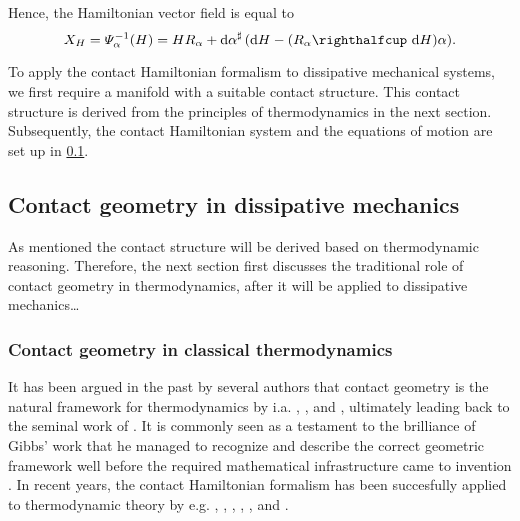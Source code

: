 Hence, the Hamiltonian vector field is equal to
\begin{equation}
    X_H = \Psi^{-1}_\alpha(H) = H R_\alpha + \fromDual{\dd{\alpha}}\qty(\dd{H} - (\intpr{R_\alpha}{\dd{H}})\alpha).
    \label{eq:contact_hamiltonian_vf}
\end{equation}

To apply the contact Hamiltonian formalism to dissipative mechanical systems, we first require a manifold with a suitable contact structure. This contact structure is derived from the principles of thermodynamics in the next section. Subsequently, the contact Hamiltonian system and the equations of motion are set up in \cref{ssec:contact_dissipation}.


\subsection{Contact geometry in dissipative mechanics}
\label{ssec:contact_dissipation}
As mentioned the contact structure will be derived based on thermodynamic reasoning. Therefore, the next section first discusses the traditional role of contact geometry in thermodynamics, after it will be applied to dissipative mechanics\dots

\subsubsection{Contact geometry in classical thermodynamics}
\label{sssec:contact_thermodynamics}
It has been argued in the past by several authors that contact geometry is the natural framework for thermodynamics by i.a. \citet{Arnold1991,Arnold1989a,Arnold1989,Arnold1989b}, \citet{Bamberg1988}, \citet{Burke1985} and \citet{Hermann1973}, ultimately leading back to the seminal work of \citet{Gibbs1873}. It is commonly seen as a testament to the brilliance of Gibbs' work that he managed to recognize and describe the correct geometric framework well before the required mathematical infrastructure came to invention \cite{Wightman1979}. In recent years, the contact Hamiltonian formalism has been succesfully applied to thermodynamic theory by e.g. \citet{Mrugala1991,Mrugala2000,Mrugala1984,Mrugala1985,Mrugala1993,Mrugala1996}, \citet{Balian2001}, \citet{VanderSchaft2021a,VanderSchaft2018}, \citet{Maschke2018}, \citet{Bravetti2015}, and \citet{Simoes2020}. 

